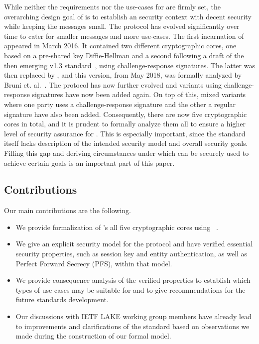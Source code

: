 \documentclass[runningheads]{llncs}
\begin{document}
While neither the requirements nor the use-cases for \mEdhoc are firmly set,
the overarching design goal of \mEdhoc is to establish an \mOscore security
context with decent security while keeping the messages small.
%
The protocol has evolved significantly over time to cater for smaller messages
and more use-cases.
%
The first incarnation of \mEdhoc appeared in March 2016.
%
It contained two different cryptographic cores, one based on a
pre-shared key Diffie-Hellman and a second following a draft of the
then emerging \mbox{\mTls v1.3} standard~\cite{ietf-tls-tls13-11}, using
challenge-response signatures.
%
The latter was then replaced by \mSigma, and this version, from May 2018, was
formally analyzed by Bruni et. al.~\cite{DBLP:conf/secsr/BruniJPS18}.
%
The protocol has now further evolved and variants using challenge-response
signatures have now been added again.
%
On top of this, mixed variants where one party uses a challenge-response
signature and the other a regular signature have also been added.
%
Consequently, there are now five cryptographic cores in total, and it is prudent
to formally analyze them all to ensure a higher level of security assurance for
\mEdhoc.
%
This is especially important, since the standard itself lacks description of the
intended security model and overall security goals.
%
Filling this gap and deriving circumstances under which \mEdhoc can be
securely used to achieve certain goals is an important part of this paper.
%

\subsection{Contributions}
\label{sec:contributions}
Our main contributions are the following.
\begin{itemize}
    \item We provide formalization of \mEdhoc's all five cryptographic cores
        using \mTamarin~\cite{DBLP:conf/cav/MeierSCB13}.
    \item We give an explicit security model for the protocol and have verified
        essential security properties, such as session key and entity
        authentication, as well as Perfect Forward Secrecy (PFS), within that
        model.
    \item We provide consequence analysis of the verified properties to
        establish which types of use-cases \mEdhoc may be suitable for and
        to give recommendations for the future standards development.
    \item Our discussions with IETF LAKE working group members have already
        lead to improvements and clarifications of the standard based on
        observations we made during the construction of our formal model.
\end{itemize}
\end{document}

